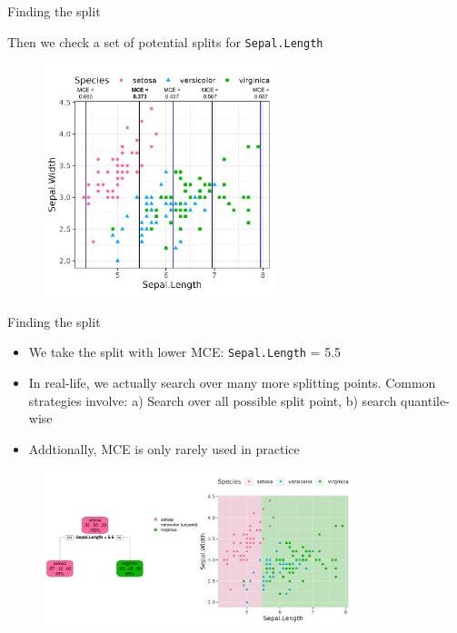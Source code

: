 \documentclass[11pt,compress,t,notes=noshow, xcolor=table]{beamer}
\begin{document}
\begin{vbframe}{Finding the split}

Then we check a set of potential splits for \texttt{Sepal.Length}

\begin{figure}
\includegraphics[width=0.6\textwidth]{figure/treegrowing-x.pdf}
\end{figure}

\end{vbframe}

\begin{vbframe}{Finding the split}

\begin{itemize}
\item We take the split with lower MCE: \texttt{Sepal.Length} = 5.5
\item In real-life, we actually search over many more splitting points.
Common strategies involve: a) Search over all possible split point, b) search quantile-wise
\item Addtionally, MCE is only rarely used in practice
\end{itemize}


\begin{figure}
\includegraphics[width=0.80\textwidth]{figure/tree-classif-depth1.pdf}
\end{figure}

\end{vbframe}
\end{document}

